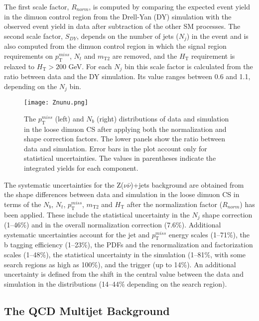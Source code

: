 The first scale factor, $R_{norm}$, is computed by comparing the expected event yield in the dimuon control region from the Drell-Yan (DY) simulation with the observed event yield in data after subtraction of the other SM processes. The second scale factor, $S_{DY}$, depends on the number of jets ($N_j$) in the event and is also computed from the dimuon control region in which the signal region requirements on $p_\text{T}^{miss}$, $N_t$ and $m_\text{T2}$ are removed, and the $H_\text{T}$ requirement is relaxed to $H_\text{T} > 200$ GeV. For each $N_j$ bin this scale factor is calculated from the ratio between data and the DY simulation. Its value ranges between 0.6 and 1.1, depending on the $N_j$ bin.

\begin{figure}[H]
	\begin{center}
		\texttt{[image: Znunu.png]} 
		\caption{The $p_\text{T}^{miss}$ (left) and $N_b$ (right) distributions of data and simulation in the loose dimuon CS after applying both the normalization and shape correction factors. The lower panels show the ratio between data and simulation. Error bars in the plot account only for statistical uncertainties. The values in parentheses indicate the integrated yields for each component.}
		\label{Znunu} 
	\end{center}
\end{figure}

The systematic uncertainties for the Z($\nu\bar{\nu}$)+jets background are obtained from the shape differences between data and simulation in the loose dimuon CS in terms of the $N_b$, $N_t$, $p_{\text{T}}^{miss}$, $m_\text{T2}$ and $H_\text{T}$ after the normalization factor ($R_{norm}$) has been applied. These include the statistical uncertainty in the $N_j$ shape correction (1--46\%) and in the overall normalization correction (7.6\%). Additional systematic uncertainties account for the jet and $p_{\text{T}}^{miss}$ energy scales (1--71\%), the b tagging efficiency (1--23\%), the PDFs and the renormalization and factorization scales (1--48\%), the statistical uncertainty in the simulation (1--81\%, with some search regions as high as 100\%), and the trigger (up to 14\%). An additional uncertainty is defined from the shift in the central value between the data and simulation in the distributions (14--44\% depending on the search region).

\subsection{The QCD Multijet Background}

